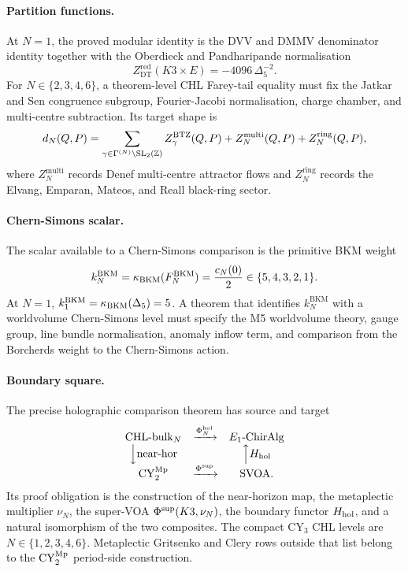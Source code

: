 \paragraph{Partition functions.}
At \(N=1\), the proved modular identity is the DVV and DMMV denominator
identity together with the Oberdieck and Pandharipande normalisation
\[
  Z^{\mathrm{red}}_{\mathrm{DT}}(K3\times E)
  =
  -4096\,\Delta_5^{-2}.
\]
For \(N\in\{2,3,4,6\}\), a theorem-level CHL Farey-tail equality must
fix the Jatkar and Sen congruence subgroup, Fourier-Jacobi
normalisation, charge chamber, and multi-centre subtraction. Its target
shape is
\[
  d_N(Q,P)=
  \sum_{\gamma\in\Gamma^{(N)}\backslash\mathrm{SL}_2(\mathbb{Z})}
  Z^{\mathrm{BTZ}}_\gamma(Q,P)
  +Z^{\mathrm{multi}}_N(Q,P)
  +Z^{\mathrm{ring}}_N(Q,P),
\]
where \(Z^{\mathrm{multi}}_N\) records Denef multi-centre attractor
flows and \(Z^{\mathrm{ring}}_N\) records the Elvang, Emparan, Mateos,
and Reall black-ring sector.

\paragraph{Chern-Simons scalar.}
The scalar available to a Chern-Simons comparison is the primitive BKM
weight
\[
  k_N^{\mathrm{BKM}}
  =
  \kappa_{\mathrm{BKM}}(F_N^{\mathrm{BKM}})
  =
  \frac{c_N(0)}2
  \in\{5,4,3,2,1\}.
\]
At \(N=1\), \(k_1^{\mathrm{BKM}}=\kappa_{\mathrm{BKM}}(\Delta_5)=5\). A theorem that
identifies \(k_N^{\mathrm{BKM}}\) with a worldvolume Chern-Simons level
must specify the M5 worldvolume theory, gauge group, line bundle
normalisation, anomaly inflow term, and comparison from the
Borcherds weight to the Chern-Simons action.

\paragraph{Boundary square.}
The precise holographic comparison theorem has source and target
\[
\begin{array}{ccc}
  \mathrm{CHL}\text{-}\mathrm{bulk}_N & \xrightarrow{\Phi^{\mathrm{hol}}_N} & E_1\text{-}\mathrm{ChirAlg}\\
  \Big\downarrow\mathrm{near\text{-}hor} & &
  \Big\uparrow H_{\mathrm{hol}}\\
  \mathrm{CY}_2^{\mathrm{Mp}} & \xrightarrow{\Phi^{\mathrm{sup}}} & \mathrm{SVOA} .
\end{array}
\]
Its proof obligation is the construction of the near-horizon map, the
metaplectic multiplier \(\nu_N\), the super-VOA
\(\Phi^{\mathrm{sup}}(K3,\nu_N)\), the boundary functor \(H_{\mathrm{hol}}\), and a natural
isomorphism of the two composites. The compact CY\(_3\) CHL levels are
\(N\in\{1,2,3,4,6\}\). Metaplectic Gritsenko and Clery rows outside
that list belong to the \(\mathrm{CY}_2^{\mathrm{Mp}}\) period-side construction.

